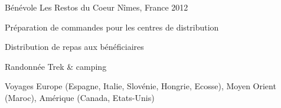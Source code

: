 

\begin{cventries}

  \cventry
    {Bénévole} %
    {Les Restos du Coeur} %
    {Nîmes, France} %
    {2012} %
    {
      \begin{cvitems} %
        \item {Préparation de commandes pour les centres de distribution}
        \item {Distribution de repas aux bénéficiaires}
      \end{cvitems}
    }

\end{cventries}


\begin{cvhonors}

  \cvhonor
    {Randonnée} %
    {Trek \& camping} %
    {} %
    {} %

  \cvhonor
    {Voyages} %
    {Europe (Espagne, Italie, Slovénie, Hongrie, Ecosse), Moyen Orient (Maroc), Amérique (Canada, Etats-Unis)} %
    {} %
    {} %
\end{cvhonors}